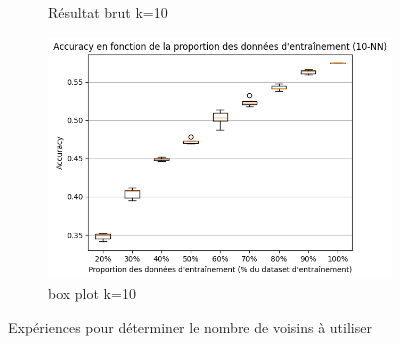 \documentclass[12pt]{article}
\begin{document}
\begin{figure}[H]
\begin{subfigure}[t]{0.35\textwidth}
        \caption{Résultat brut k=10}
    \end{subfigure}
    \hfill
    \begin{subfigure}[t]{0.35\textwidth}
        \centering
        \includegraphics[width=\textwidth]{static/knn_goo_10.png}
        \caption{box plot k=10}
    \end{subfigure}

    \caption{Expériences pour déterminer le nombre de voisins à utiliser}
\end{figure}
\end{document}
